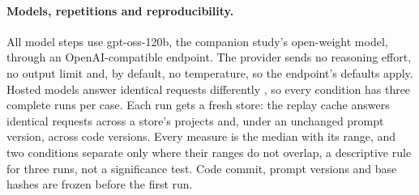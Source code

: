 \paragraph{Models, repetitions and reproducibility.} All model steps use gpt-oss-120b, the companion study's
open-weight model, through an OpenAI-compatible endpoint. The provider sends no reasoning effort, no output limit
and, by default, no temperature, so the endpoint's defaults apply. %
  Hosted models answer identical requests
differently \cite{atil2025nondeterminism}, so every condition has three complete runs per case. Each run gets a
fresh store: the replay cache answers identical requests across a store's projects and, under an unchanged prompt
version, across code versions. %
 Every measure is the median with its range, and two conditions separate only
where their ranges do not overlap, a descriptive rule for three runs, not a significance test. Code commit, prompt
versions and base hashes are frozen before the first run. 

